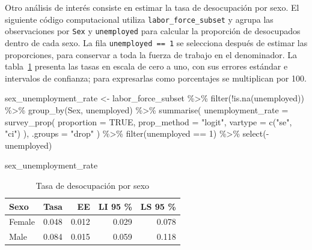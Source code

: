 \documentclass[
  spanish,
  11pt,
  letterpaper,
  oneside,
  open=any]{scrbook}
\newenvironment{Shaded}{\begin{snugshade}}{\end{snugshade}}
\newcommand{\AttributeTok}[1]{\textcolor[rgb]{0.40,0.45,0.13}{#1}}
\newcommand{\ConstantTok}[1]{\textcolor[rgb]{0.56,0.35,0.01}{#1}}
\newcommand{\DecValTok}[1]{\textcolor[rgb]{0.68,0.00,0.00}{#1}}
\newcommand{\FunctionTok}[1]{\textcolor[rgb]{0.28,0.35,0.67}{#1}}
\newcommand{\NormalTok}[1]{\textcolor[rgb]{0.00,0.23,0.31}{#1}}
\newcommand{\OtherTok}[1]{\textcolor[rgb]{0.00,0.23,0.31}{#1}}
\newcommand{\SpecialCharTok}[1]{\textcolor[rgb]{0.37,0.37,0.37}{#1}}
\newcommand{\StringTok}[1]{\textcolor[rgb]{0.13,0.47,0.30}{#1}}
\begin{document}
Otro análisis de interés consiste en estimar la tasa de desocupación por
sexo. El siguiente código computacional utiliza
\texttt{labor\_force\_subset} y agrupa las observaciones por
\texttt{Sex} y \texttt{unemployed} para calcular la proporción de
desocupados dentro de cada sexo. La fila \texttt{unemployed\ ==\ 1} se
selecciona después de estimar las proporciones, para conservar a toda la
fuerza de trabajo en el denominador. La
tabla~\ref{tbl-tasa-desocupacion-sexo} presenta las tasas en escala de
cero a uno, con sus errores estándar e intervalos de confianza; para
expresarlas como porcentajes se multiplican por 100.

\begin{Shaded}
\begin{Highlighting}[]
\NormalTok{sex\_unemployment\_rate }\OtherTok{\textless{}{-}}\NormalTok{ labor\_force\_subset }\SpecialCharTok{\%\textgreater{}\%}
  \FunctionTok{filter}\NormalTok{(}\SpecialCharTok{!}\FunctionTok{is.na}\NormalTok{(unemployed)) }\SpecialCharTok{\%\textgreater{}\%}
  \FunctionTok{group\_by}\NormalTok{(Sex, unemployed) }\SpecialCharTok{\%\textgreater{}\%}
  \FunctionTok{summarise}\NormalTok{(}
    \AttributeTok{unemployment\_rate =} \FunctionTok{survey\_prop}\NormalTok{(}
      \AttributeTok{proportion =} \ConstantTok{TRUE}\NormalTok{,}
      \AttributeTok{prop\_method =} \StringTok{"logit"}\NormalTok{,}
      \AttributeTok{vartype =} \FunctionTok{c}\NormalTok{(}\StringTok{"se"}\NormalTok{, }\StringTok{"ci"}\NormalTok{)}
\NormalTok{    ),}
    \AttributeTok{.groups =} \StringTok{"drop"}
\NormalTok{  ) }\SpecialCharTok{\%\textgreater{}\%}
  \FunctionTok{filter}\NormalTok{(unemployed }\SpecialCharTok{==} \DecValTok{1}\NormalTok{) }\SpecialCharTok{\%\textgreater{}\%}
  \FunctionTok{select}\NormalTok{(}\SpecialCharTok{{-}}\NormalTok{unemployed)}

\NormalTok{sex\_unemployment\_rate}
\end{Highlighting}
\end{Shaded}

{

\begin{longtable}[]{@{}lrrrr@{}}

\caption{\label{tbl-tasa-desocupacion-sexo}Tasa de desocupación por
sexo}

\tabularnewline

\toprule\noalign{}
Sexo & Tasa & EE & LI 95 \% & LS 95 \% \\
\midrule\noalign{}
\endhead
\bottomrule\noalign{}
\endlastfoot
Female & 0.048 & 0.012 & 0.029 & 0.078 \\
Male & 0.084 & 0.015 & 0.059 & 0.118 \\

\end{longtable}

}
\end{document}
